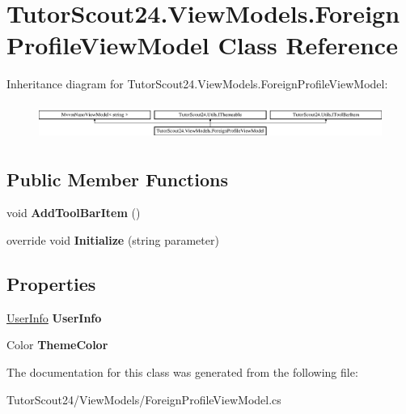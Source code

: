 \hypertarget{class_tutor_scout24_1_1_view_models_1_1_foreign_profile_view_model}{}\section{Tutor\+Scout24.\+View\+Models.\+Foreign\+Profile\+View\+Model Class Reference}
\label{class_tutor_scout24_1_1_view_models_1_1_foreign_profile_view_model}
Inheritance diagram for Tutor\+Scout24.\+View\+Models.\+Foreign\+Profile\+View\+Model\+:\begin{figure}[H]
\begin{center}
\leavevmode
\includegraphics[height=1.181435cm]{class_tutor_scout24_1_1_view_models_1_1_foreign_profile_view_model}
\end{center}
\end{figure}
\subsection*{Public Member Functions}
\begin{DoxyCompactItemize}
\item 
\mbox{\label{class_tutor_scout24_1_1_view_models_1_1_foreign_profile_view_model_abadeeed083ff5a2b68eabbef0e9377f3}} 
void {\bfseries Add\+Tool\+Bar\+Item} ()
\item 
\mbox{\label{class_tutor_scout24_1_1_view_models_1_1_foreign_profile_view_model_a4545eb4708024c9694bbec55dc8cf74e}} 
override void {\bfseries Initialize} (string parameter)
\end{DoxyCompactItemize}
\subsection*{Properties}
\begin{DoxyCompactItemize}
\item 
\mbox{\label{class_tutor_scout24_1_1_view_models_1_1_foreign_profile_view_model_a87bb66593baa5cc6c42658866bc95651}} 
\mbox{\hyperlink{class_tutor_scout24_1_1_models_1_1_user_data_1_1_user_info}{User\+Info}} {\bfseries User\+Info}
\item 
\mbox{\label{class_tutor_scout24_1_1_view_models_1_1_foreign_profile_view_model_acd70ee6e22af066b2d9bce61d6d679dd}} 
Color {\bfseries Theme\+Color}
\end{DoxyCompactItemize}


The documentation for this class was generated from the following file\+:\begin{DoxyCompactItemize}
\item 
Tutor\+Scout24/\+View\+Models/Foreign\+Profile\+View\+Model.\+cs\end{DoxyCompactItemize}
